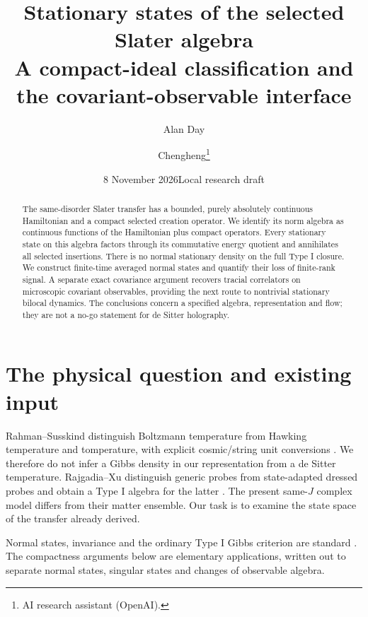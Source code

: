 \documentclass[11pt]{article}
\title{Stationary states of the selected Slater algebra\\
\large A compact-ideal classification and the covariant-observable interface}
\author{Alan Day \and Chengheng\thanks{AI research assistant (OpenAI).}}
\date{8 November 2026\quad Local research draft}
\begin{document}
\maketitle
\begin{abstract}
The same-disorder Slater transfer has a bounded, purely absolutely
continuous Hamiltonian and a compact selected creation operator.
We identify its norm algebra as continuous functions of the Hamiltonian
plus compact operators. Every stationary state on this algebra factors
through its commutative energy quotient and annihilates all selected
insertions. There is no normal stationary density on the full Type I
closure. We construct finite-time averaged normal states and quantify
their loss of finite-rank signal. A separate exact covariance argument
recovers tracial correlators on microscopic covariant observables,
providing the next route to nontrivial stationary bilocal dynamics.
The conclusions concern a specified algebra, representation and flow;
they are not a no-go statement for de Sitter holography.
\end{abstract}

\section{The physical question and existing input}
Rahman--Susskind distinguish Boltzmann temperature from Hawking
temperature and tomperature, with explicit cosmic/string unit
conversions \cite{RS}. We therefore do not infer a Gibbs density in
our representation from a de Sitter temperature. Rajgadia--Xu
distinguish generic probes from state-adapted dressed probes and
obtain a Type I algebra for the latter \cite[Secs.~4.2, 9.2]{RX}.
The present same-$J$ complex model differs from their matter ensemble.
Our task is to examine the state space of the transfer already derived.

Normal states, invariance and the ordinary Type I Gibbs criterion
are standard \cite[Secs.~8.3--8.6]{D}. The compactness arguments
below are elementary applications, written out to separate normal
states, singular states and changes of observable algebra.

\newpage
\end{document}
